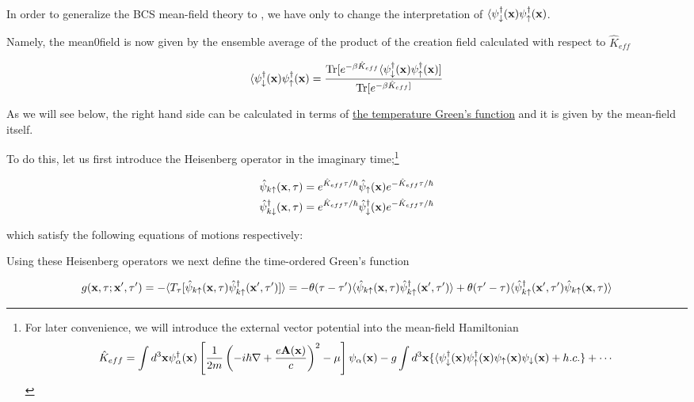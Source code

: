 \dotfill

\ 

In order to generalize the BCS mean-field theory to {}, we have only to change the interpretation of $\langle\psi_{\downarrow}^\dagger({\bf x})\psi_{\uparrow}^\dagger({\bf x})$. 

Namely, the mean0field is now given by the ensemble average of the product of the creation field calculated with respect to $\hat{K}_{eff}$

\[\langle\psi_{\downarrow}^\dagger({\bf x})\psi_{\uparrow}^\dagger({\bf x}) = \frac{\text{Tr}[e^{-\beta\hat{K}_{eff}}\langle\psi_{\downarrow}^\dagger({\bf x})\psi_{\uparrow}^\dagger({\bf x})]}{\text{Tr}[e^{-\beta\hat{K}_{eff}]}} \]

As we will see below, the right hand side can be calculated in terms of \uline{the temperature Green's function} and it is given by the mean-field itself. 

To do this, let us first introduce the Heisenberg operator in the imaginary time;\footnote{For later convenience, we will introduce the external vector potential into the mean-field Hamiltonian
\[\hat{K}_{eff}=\int d^3{\bf x}\psi_{\alpha}^\dagger({\bf x})\left[\frac{1}{2m}\left(-i\hbar\nabla+\frac{e{\bf A}({\bf x})}{c}\right)^2-\mu\right]\psi_{\alpha}({\bf x}) - g\int d^3{\bf x}\{\langle\psi_{\downarrow}^\dagger({\bf x})\psi_{\uparrow}^\dagger({\bf x})\psi_{\uparrow}({\bf x})\psi_{\downarrow}({\bf x})+ h.c.\}+\cdots \]}

\[\begin{split}
\hat{\psi}_{k\uparrow}({\bf x},\tau) &= e^{\hat{K}_{eff}\tau/\hbar}\hat{\psi}_{\uparrow}({\bf x})e^{-\hat{K}_{eff}\tau/\hbar}\\
\hat{\psi}^\dagger_{k\downarrow}({\bf x},\tau) &= e^{\hat{K}_{eff}\tau/\hbar}\hat{\psi}^\dagger_{\downarrow}({\bf x})e^{-\hat{K}_{eff}\tau/\hbar}
\end{split} \]

which satisfy the following  equations of motions respectively:%

Using these Heisenberg operators we next define the time-ordered Green's function

\[g({\bf x},\tau;{\bf x}',\tau') = -\langle T_{\tau}[\hat{\psi}_{k\uparrow}({\bf x},\tau)\hat{\psi}^\dagger_{k\uparrow}({\bf x}',\tau')]\rangle = -\theta(\tau-\tau')\langle\hat{\psi}_{k\uparrow}({\bf x},\tau)\hat{\psi}^\dagger_{k\uparrow}({\bf x}',\tau')\rangle + \theta(\tau'-\tau)\langle\hat{\psi}^\dagger_{k\uparrow}({\bf x}',\tau')\hat{\psi}_{k\uparrow}({\bf x},\tau)\rangle\]

